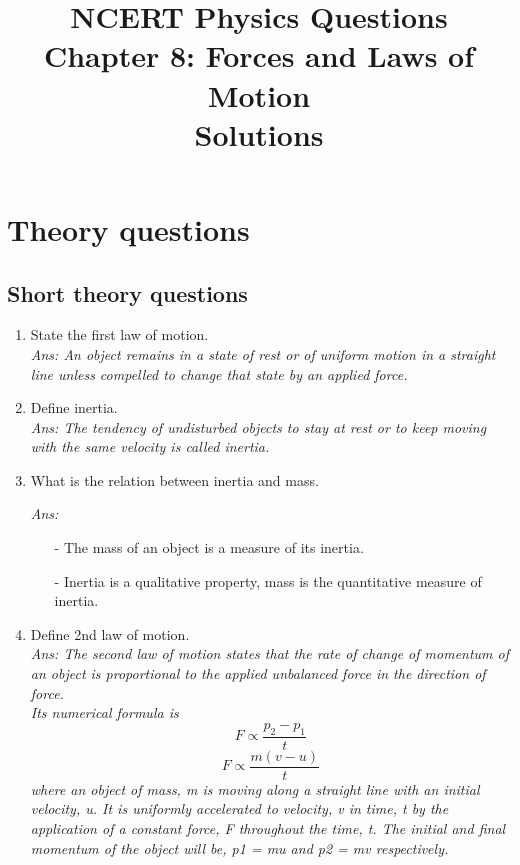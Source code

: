 \documentclass[12pt]{article}
\title{NCERT Physics Questions \\ Chapter 8: Forces and Laws of Motion \\ Solutions}
\author{}
\date{}
\begin{document}
\maketitle

\section*{Theory questions}
\subsection*{Short theory questions}

\begin{enumerate}

	\item State the first law of motion. \\
		{\itshape
			Ans: An object remains in a state of rest or of
			uniform motion in a straight line unless
			compelled to change that state by an
			applied force.
		}

	\item Define inertia. \\
		{\itshape 
			Ans: The tendency of undisturbed objects to stay
			at rest or to keep moving with the same
			velocity is called inertia.
		}

	\item What is the relation between inertia and mass. \\
		{\itshape Ans:
			\begin{itemize}
				\item[-] The mass of an object is a measure of
				its inertia.
				\item[-] Inertia is a qualitative property, mass is the quantitative measure of inertia.
			\end{itemize}
		}

	\item Define 2nd law of motion. \\
		{\itshape Ans:
			The second law of motion states that the
			rate of change of momentum of an object is
			proportional to the applied unbalanced force
			in the direction of force. \\ 
			Its numerical formula is \[ F \propto \frac{p_2 - p_1}{t} \]
			\[ F \propto \frac{m(v-u)}{t} \]
			where an object of mass, m is moving along
			a straight line with an initial velocity, u. It is
			uniformly accelerated to velocity, v in time, t
			by the application of a constant force, F
			throughout the time, t. The initial and final
			momentum of the object will be, p1 = mu and p2 = mv respectively.
		}


\end{enumerate}
\end{document}
